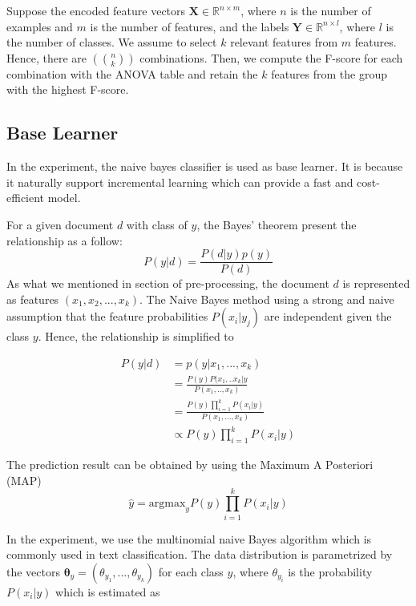 Suppose the encoded feature vectors $\mathbf{X} \in \mathbb{R}^{n\times m}$, where $n$ is the number of examples and $m$ is the number of features, and the labels $\mathbf{Y} \in \mathbb{R}^{n\times l}$, where $l$ is the number of classes. We assume to select $k$ relevant features from $m$ features. Hence, there are $(n \choose k)$ combinations. Then, we compute the F-score for each combination with the ANOVA table and retain the $k$ features from the group with the highest F-score. 


\subsection{Base Learner}
In the experiment, the naive bayes classifier is used as base learner. It is because it naturally support incremental learning which can provide a fast and cost-efficient model.

For a given document $d$ with class of $y$, the Bayes' theorem present the relationship as a follow:
\begin{equation}
P(y|d) = \frac{P(d|y) p(y)}{P(d)}
\end{equation}
As what we mentioned in section of pre-processing, the document $d$ is represented as features $(x_1, x_2,...,x_k)$. The Naive Bayes method using a strong and naive assumption that the feature probabilities $P(x_i|y_j)$ are independent given the class $y$. Hence, the relationship is simplified to

\begin{equation}
\begin{aligned}
P(y|d) & = p(y|x_1,...,x_k) \\
	   & = \frac{P(y)P(x_1,..x_k|y}{P(x_1,..,x_k)}\\
	   & = \frac{P(y)\prod_{i=1}^kP(x_i|y)}{P(x_1,...,x_k)}\\
	   & \propto P(y)\prod_{i=1}^kP(x_i|y)
\end{aligned}
\end{equation}

The prediction result can be obtained by using the Maximum A Posteriori (MAP)
\begin{equation}
\hat{y} = \mbox{argmax}_y P(y)\prod_{i=1}^kP(x_i|y)
\end{equation}

In the experiment, we use the multinomial naive Bayes algorithm which is commonly used in text classification. The data distribution is parametrized by the vectors $\mathbf{\theta}_y = (\theta_{y_1}, ..., \theta_{y_k})$ for each class $y$, where $\theta_{y_i}$ is the probability $P(x_i|y)$ which is estimated as

